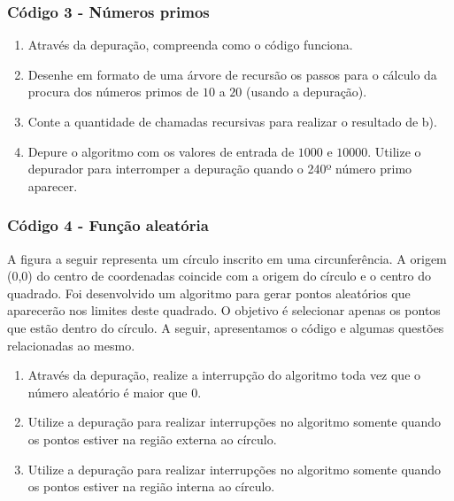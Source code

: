 \documentclass[12pt]{article}
\begin{document}
\newpage
\subsubsection*{Código 3 - Números primos}

\begin{enumerate}[label=\alph*)]
    \item Através da depuração, compreenda como o código funciona.
    \item Desenhe em formato de uma árvore de recursão os passos para o cálculo da procura dos números primos de $10$ a $20$ (usando a depuração).
    \item Conte a quantidade de chamadas recursivas para realizar o resultado de b).
    \item Depure o algoritmo com os valores de entrada de $1000$ e $10000$. Utilize o depurador para interromper a depuração quando o 240º número primo aparecer.
\end{enumerate}

\newpage

\subsubsection*{Código 4 - Função aleatória}
A figura a seguir representa um círculo inscrito em uma circunferência. A origem (0,0) do centro de coordenadas coincide com a origem do círculo e o centro do quadrado. Foi desenvolvido um algoritmo para gerar pontos aleatórios que aparecerão nos limites deste quadrado. O objetivo é selecionar apenas os pontos que estão dentro do círculo. A seguir, apresentamos o código e algumas questões relacionadas ao mesmo.

\begin{center}
\end{center}


\begin{enumerate}[label=\alph*)]
    \item Através da depuração, realize a interrupção do algoritmo toda vez que o número aleatório é maior que $0$.
    \item Utilize a depuração para realizar interrupções no algoritmo somente quando os pontos estiver na região externa ao círculo.
    \item Utilize a depuração para realizar interrupções no algoritmo somente quando os pontos estiver na região interna ao círculo.
\end{enumerate}
\end{document}
